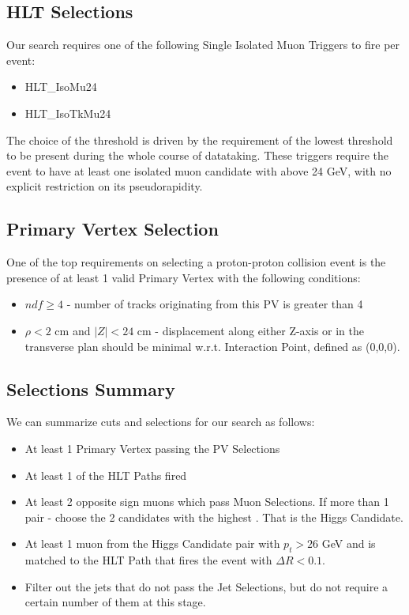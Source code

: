 \subsection{HLT Selections}
Our search requires one of the following Single Isolated Muon Triggers to fire per event:
\begin{itemize}
  \item HLT\_IsoMu24
  \item HLT\_IsoTkMu24
\end{itemize}
The choice of the threshold is driven by the requirement of the lowest \pt threshold to be present during the whole course of datataking. These triggers require the event to have at least one isolated muon candidate with \pt above 24 GeV, with no explicit restriction on its pseudorapidity.

\subsection{Primary Vertex Selection}
One of the top requirements on selecting a proton-proton collision event is the presence of at least 1 valid Primary Vertex with the following conditions:
\begin{itemize}
  \item $ndf \ge 4$ - number of tracks originating from this PV is greater than 4
  \item $\rho < 2$ cm and $|Z| < 24$ cm - displacement along either Z-axis or in the transverse plan should be minimal w.r.t. Interaction Point, defined as (0,0,0).
\end{itemize}

\subsection{Selections Summary}
We can summarize cuts and selections for our search as follows:
\begin{itemize}
  \item At least 1 Primary Vertex passing the PV Selections
  \item At least 1 of the HLT Paths fired
  \item At least 2 opposite sign muons which pass Muon Selections. If more than 1 pair - choose the 2 candidates with the highest \pt. That is the Higgs Candidate.
  \item At least 1 muon from the Higgs Candidate pair with $p_t > 26$ GeV and is matched to the HLT Path that fires the event with $\Delta R < 0.1$.
  \item Filter out the jets that do not pass the Jet Selections, but do not require a certain number of them at this stage.
\end{itemize}

